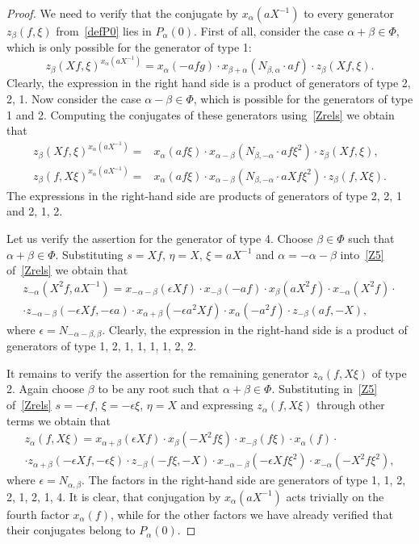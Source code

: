 \documentclass[oneside, 8pt]{amsart}
\theoremstyle{remark}
\theoremstyle{definition}
\numberwithin{equation}{section}
\begin{document}
\begin{proof} We need to verify that the conjugate by $x_\alpha(aX^{-1})$ to every generator $z_\beta(f, \xi)$ from~\cref{defP0} lies in $P_\alpha(0)$. 
First of all, consider the case $\alpha + \beta \in \Phi$, which is only possible for the generator of type 1:
\[ z_{\beta}(Xf, \xi) ^ {x_{\alpha}(aX^{-1})} = x_{\alpha} (- afg) \cdot x_{\beta+\alpha} (N_{\beta, \alpha}\cdot af)     \cdot z_{\beta}(Xf, \xi). \]
Clearly, the expression in the right hand side is a product of generators of type 2, 2, 1. 
Now consider the case $\alpha - \beta \in \Phi$, which is possible for the generators of type 1 and 2.
Computing the conjugates of these generators using~\cref{Zrels} we obtain that
\begin{align} z_{\beta}(Xf, \xi) ^ {x_{\alpha}(aX^{-1})} = &  x_{\alpha} (af\xi) \cdot x_{\alpha-\beta} (N_{\beta,-\alpha}\cdot af\xi^2) \cdot z_{\beta}(Xf, \xi), \\
z_{\beta}(f, X\xi) ^ {x_{\alpha}(aX^{-1})} = & x_{\alpha} (af\xi) \cdot x_{\alpha-\beta} (N_{\beta,-\alpha}\cdot aXf\xi^2) \cdot z_{\beta}(f, X\xi). \end{align}
The expressions in the right-hand side are products of generators of type 2, 2, 1 and 2, 1, 2.

Let us verify the assertion for the generator of type 4.
Choose $\beta\in \Phi$ such that $\alpha+\beta \in \Phi$. 
Substituting $s = Xf$, $\eta = X$, $\xi = aX^{-1}$ and $\alpha = -\alpha - \beta$ into~\eqref{Z5} of~\cref{Zrels} we obtain that
\begin{multline} \nonumber z_{-\alpha}(X^2f, aX^{-1}) = x_{-\alpha-\beta}(\epsilon Xf) \cdot x_{-\beta}(-af) \cdot x_{\beta}(aX^2 f) \cdot x_{-\alpha}(X^2f) \cdot \\
 \cdot z_{-\alpha-\beta}(-\epsilon Xf, -\epsilon a) \cdot x_{\alpha+\beta}(-\epsilon a^2 Xf) \cdot x_{\alpha}(- a^2 f) \cdot z_{-\beta}(a f, -X), \end{multline}
where $\epsilon = N_{-\alpha-\beta,\beta}$. 
Clearly, the expression in the right-hand side is a product of generators of type 1, 2, 1, 1, 1, 1, 2, 2.

It remains to verify the assertion for the remaining generator $z_\alpha(f, X\xi)$ of type 2.
Again choose $\beta$ to be any root such that $\alpha+\beta \in \Phi$.
Substituting in~\eqref{Z5} of~\cref{Zrels} $s = -\epsilon f$, $\xi = -\epsilon \xi$, $\eta=X$ and expressing $z_\alpha(f, X\xi)$ through other terms we obtain that
\begin{multline} \nonumber z_\alpha(f, X\xi) = x_{\alpha+\beta}(\epsilon Xf) \cdot x_{\beta}(-X^2 f \xi) \cdot x_{-\beta}(f \xi) \cdot x_\alpha(f) \cdot \\ 
 \cdot z_{\alpha+\beta}(-\epsilon X f, -\epsilon \xi) \cdot z_{-\beta}(-f\xi, -X) \cdot x_{-\alpha-\beta}(-\epsilon X f \xi^2) \cdot x_{-\alpha}(-X^2 f\xi^2), \end{multline}
where $\epsilon = N_{\alpha,\beta}$.  
The factors in the right-hand side are generators of type 1, 1, 2, 2, 1, 2, 1, 4. 
It is clear, that conjugation by $x_{\alpha}(aX^{-1})$ acts trivially on the fourth factor $x_\alpha(f)$, 
while for the other factors we have already verified that their conjugates belong to $P_{\alpha}(0)$. \end{proof}
\end{document}
